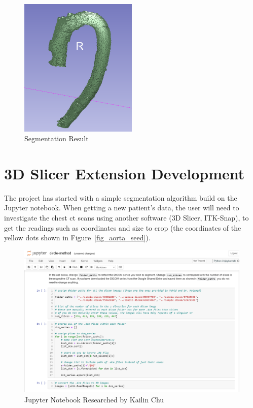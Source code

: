 \begin{figure}[H]
    \centering
    \includegraphics[width=0.5\textwidth]{figures/AGR/segmentation_result.png}
    \caption[Segmentation Result]{Segmentation Result}
    \label{fig_sr}
\end{figure}

\section{3D Slicer Extension Development}
The project has started with a simple segmentation algorithm build on the Jupyter notebook. When getting a new patient's data, the user will need to investigate the chest ct scans using another software (3D Slicer, ITK-Snap), to get the readings such as coordinates and size to crop (the coordinates of the yellow dots shown in Figure~\ref{fig_aorta_seed}).

\begin{figure}[H]
    \centering
    \includegraphics[width=\textwidth]{figures/AGR/jupyter_research.png}
    \caption[Jupyter Notebook Research]{Jupyter Notebook Researched by Kailin Chu}
    \label{fig_jnr}
\end{figure}

